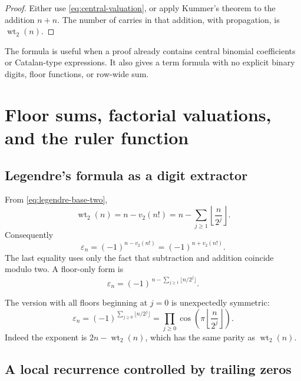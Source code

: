 \documentclass[11pt,oneside]{article}
\theoremstyle{definition}
\theoremstyle{remark}
\newcommand{\wt}{\operatorname{wt}_2}
\newcommand{\vtwo}{v_2}
\begin{document}
\begin{proof}
Either use \eqref{eq:central-valuation}, or apply Kummer's theorem to the
addition \(n+n\).  The number of carries in that addition, with propagation,
is \(\wt(n)\).
\end{proof}

The formula is useful when a proof already contains central binomial
coefficients or Catalan-type expressions.  It also gives a term formula with
no explicit binary digits, floor functions, or row-wide sum.

\section{Floor sums, factorial valuations, and the ruler function}
\label{sec:valuations}

\subsection{Legendre's formula as a digit extractor}

From \eqref{eq:legendre-base-two},
\begin{equation}
 \wt(n)=n-\vtwo(n!)
       =n-\sum_{j\ge1}\left\lfloor\frac{n}{2^j}\right\rfloor.
 \label{eq:weight-floor}
\end{equation}
Consequently
\begin{equation}
 \varepsilon_n
 =(-1)^{n-\vtwo(n!)}
 =(-1)^{n+\vtwo(n!)}.
 \label{eq:factorial-sign}
\end{equation}
The last equality uses only the fact that subtraction and addition coincide
modulo two.  A floor-only form is
\begin{equation}
 \varepsilon_n
 =(-1)^{\,n-\sum_{j\ge1}\lfloor n/2^j\rfloor}.
 \label{eq:floor-only-sign}
\end{equation}

The version with all floors beginning at \(j=0\) is unexpectedly symmetric:
\begin{equation}
 \varepsilon_n
 =(-1)^{\sum_{j\ge0}\lfloor n/2^j\rfloor}
 =\prod_{j\ge0}\cos\!\left(\pi\left\lfloor\frac{n}{2^j}\right\rfloor\right).
 \label{eq:floor-cos-product}
\end{equation}
Indeed the exponent is \(2n-\wt(n)\), which has the same parity as
\(\wt(n)\).

\subsection{A local recurrence controlled by trailing zeros}
\end{document}
